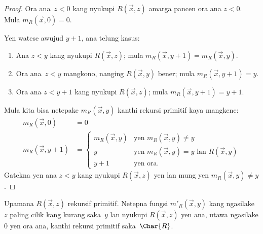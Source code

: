 \documentclass[../../../include/open-logic-section]{subfiles}
\begin{document}
\begin{proof}
Ora ana~$z < 0$ kang nyukupi $R(\vec{x}, z)$ amarga
pancen ora ana $z < 0$. Mula $m_R(\vec x, 0) = 0$.

Yen watese awujud $y + 1$, ana telung kasus:
\begin{enumerate}
\item Ana $z < y$ kang nyukupi $R(\vec{x}, z)$;
mula $m_R(\vec{x}, y+1) = m_R(\vec{x}, y)$.
\item Ora ana~$z<y$ mangkono, nanging $R(\vec{x}, y)$
bener; mula $m_R(\vec{x}, y+1) = y$.
%
%
\item Ora ana $z < y+1$ kang nyukupi $R(\vec{x}, z)$;
mula $m_R(\vec{x}, y+1) = y+1$.
\end{enumerate}
Mula kita bisa netepake $m_R(\vec x, y)$ kanthi rekursi
primitif kaya mangkene:
\begin{align*}
m_R(\vec{x}, 0) & = 0\\
m_R(\vec{x}, y+1) & =
\begin{cases}
m_R(\vec{x}, y) & \text{yen $m_R(\vec x, y) \neq y$}\\
y & \text{yen $m_R(\vec x, y) = y$ lan $R(\vec{x}, y)$}\\
y+1 & \text{yen ora.}
\end{cases}
\end{align*}
Gatekna yen ana $z<y$ kang nyukupi $R(\vec x, z)$
yen lan mung yen $m_R(\vec x,
y) \neq y$.
\end{proof}

\begin{prob}
Upamana $R(\vec x, z)$ rekursif primitif. Netepna fungsi
$m'_R(\vec{x}, y)$ kang ngasilake~$z$ paling cilik kang
kurang saka~$y$ lan nyukupi $R(\vec{x}, z)$ yen ana,
utawa ngasilake $0$ yen ora ana, kanthi rekursi
primitif saka~$\Char{R}$.
\end{prob}
\end{document}
